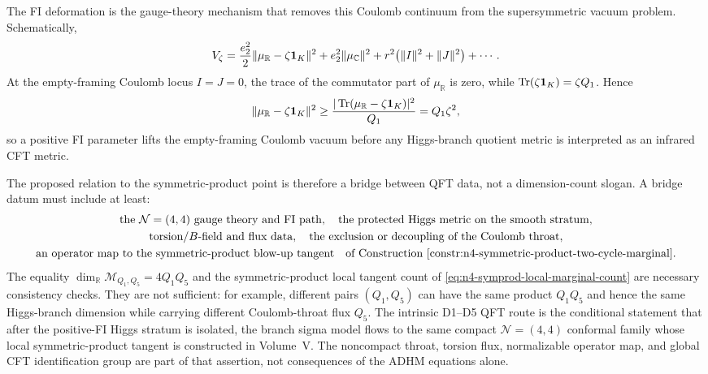 \begin{remark}
The FI deformation is the gauge-theory mechanism that removes this Coulomb
continuum from the supersymmetric vacuum problem.  Schematically,
\[
  V_\zeta
  =
  \frac{e_2^2}{2}\|\mu_{\mathbb R}-\zeta{\bf1}_K\|^2
  +e_2^2\|\mu_{\mathbb C}\|^2
  +r^2\bigl(\|I\|^2+\|J\|^2\bigr)+\cdots .
\]
At the empty-framing Coulomb locus \(I=J=0\), the trace of the commutator
part of \(\mu_{\mathbb R}\) is zero, while
\(\operatorname{Tr}(\zeta{\bf1}_K)=\zeta Q_1\).  Hence
\begin{equation}
  \|\mu_{\mathbb R}-\zeta{\bf1}_K\|^2
  \ge
  \frac{|\operatorname{Tr}(\mu_{\mathbb R}-\zeta{\bf1}_K)|^2}{Q_1}
  =
  Q_1\zeta^2 ,
  \label{eq:d1-d5-positive-fi-coulomb-lift-bound}
\end{equation}
so a positive FI parameter lifts the empty-framing Coulomb vacuum before any
Higgs-branch quotient metric is interpreted as an infrared CFT metric.

The proposed relation to the symmetric-product point is therefore a bridge
between QFT data, not a dimension-count slogan.  A bridge datum must include
at least:
\[
\begin{gathered}
  \text{the \(\mathcal N=(4,4)\) gauge theory and FI path},\quad
  \text{the protected Higgs metric on the smooth stratum},\\
  \text{torsion/\(B\)-field and flux data},\quad
  \text{the exclusion or decoupling of the Coulomb throat},\\
  \text{an operator map to the symmetric-product blow-up tangent}
  \quad
  \text{of Construction~\ref{constr:n4-symmetric-product-two-cycle-marginal}}.
\end{gathered}
\]
The equality
\(\dim_{\mathbb R}\mathcal M_{Q_1,Q_5}=4Q_1Q_5\) and the symmetric-product
local tangent count of
\eqref{eq:n4-symprod-local-marginal-count} are necessary consistency checks.
They are not sufficient: for example, different pairs \((Q_1,Q_5)\) can have
the same product \(Q_1Q_5\) and hence the same Higgs-branch dimension while
carrying different Coulomb-throat flux \(Q_5\).  The intrinsic D1--D5 QFT
route is the conditional statement that after the positive-FI Higgs stratum is
isolated, the branch sigma model flows to the same compact
\(\mathcal N=(4,4)\) conformal family whose local symmetric-product tangent is
constructed in Volume~V.  The noncompact throat, torsion flux, normalizable
operator map, and global CFT identification group are part of that assertion,
not consequences of the ADHM equations alone.
\end{remark}

